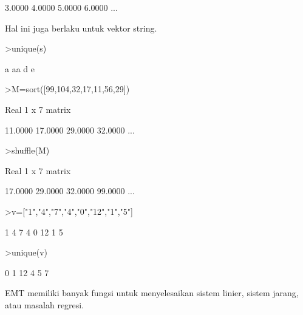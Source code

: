 \documentclass{article}
\begin{document}
\begin{eulernotebook}
\begin{euleroutput}
       3.0000      4.0000      5.0000      6.0000     ...
\end{euleroutput}
\begin{eulercomment}
Hal ini juga berlaku untuk vektor string.
\end{eulercomment}
\begin{eulerprompt}
>unique(s)
\end{eulerprompt}
\begin{euleroutput}
  a
  aa
  d
  e
\end{euleroutput}
\begin{eulerprompt}
>M=sort([99,104,32,17,11,56,29])
\end{eulerprompt}
\begin{euleroutput}
  Real 1 x 7 matrix
  
      11.0000     17.0000     29.0000     32.0000     ...
\end{euleroutput}
\begin{eulerprompt}
>shuffle(M)
\end{eulerprompt}
\begin{euleroutput}
  Real 1 x 7 matrix
  
      17.0000     29.0000     32.0000     99.0000     ...
\end{euleroutput}
\begin{eulerprompt}
>v=["1","4","7","4","0","12","1","5"]
\end{eulerprompt}
\begin{euleroutput}
  1
  4
  7
  4
  0
  12
  1
  5
\end{euleroutput}
\begin{eulerprompt}
>unique(v)
\end{eulerprompt}
\begin{euleroutput}
  0
  1
  12
  4
  5
  7
\end{euleroutput}
\begin{eulercomment}
EMT memiliki banyak fungsi untuk menyelesaikan sistem linier, sistem
jarang, atau masalah regresi.



\end{eulercomment}
\end{eulernotebook}
\end{document}
